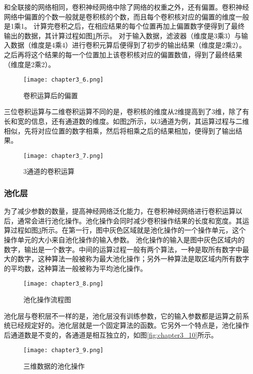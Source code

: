 和全联接的网络相同，卷积神经网络中除了网络的权重之外，还有偏置。卷积神经网络中偏置的个数一般就是卷积核的个数，而且每个卷积核对应的偏置的维度一般是1乘1。
计算完卷积之后，在相应结果的每个位置再加上偏置数字便得到了最终输出的数据，其计算过程如图\ref{fig:chapter3_6}所示。
对于输入数据，滤波器（维度是3乘3）与输入数据（维度是4乘4）进行卷积元算后便得到了初步的输出结果（维度是2乘2）。之后再将这个结果的每一个位置加上该卷积核对应的偏置数值，得到了最终结果（维度是2乘2）。
\begin{figure}
    \centering
    \texttt{[image: chapter3\_6.png]}
    \caption{卷积运算后的偏置\cite{luyujie_206}}
    \label{fig:chapter3_6}
\end{figure}

三位卷积运算与二维卷积运算不同的是，卷积核的维度从2维提高到了3维，除了有长和宽的信息，还有通道数的维度。如图\ref{fig:chapter3_7}所示，以3通道为例，其运算过程与二维相似，先将对应位置的数字相乘，然后将相乘之后的结果相加，便得到了输出结果。
\begin{figure}
    \centering
    \texttt{[image: chapter3\_7.png]}
    \caption{3通道的卷积运算\cite{luyujie_206}}
    \label{fig:chapter3_7}
\end{figure}
\subsubsection{池化层}
为了减少参数的数量，提高神经网络泛化能力，在卷积神经网络进行卷积运算以后，通常会进行池化操作。池化操作会同时减少卷积操作结果的长度和宽度。其运算过程如图\ref{fig:chapter3_8}所示。在第一行，图中灰色区域就是池化操作的一个操作单元，这个操作单元的大小来自池化操作的输入参数。
池化操作的输入是图中灰色区域内的数字，输出是一个数字。中间的运算过程一般有两个算法，一种是取所有数字中最大的数字，这种算法一般被称为最大池化操作；另外一种算法是取区域内所有数字的平均数，这种算法一般被称为平均池化操作。
\begin{figure}
    \centering
    \texttt{[image: chapter3\_8.png]}
    \caption{池化操作流程图\cite{luyujie_214}}
    \label{fig:chapter3_8}
\end{figure}

池化层与卷积层不一样的是，池化层没有训练参数，它的输入参数都是运算之前系统已经规定好的。池化层就是一个固定算法的函数。它另外一个特点是，池化操作后通道数是不变的，各通道是相互独立的，如图\ref{fig:chapter3_10}所示。
\begin{figure}
    \centering
    \texttt{[image: chapter3\_9.png]}
    \caption{三维数据的池化操作\cite{luyujie_215}}
    \label{fig:chapter3_9}
\end{figure}

